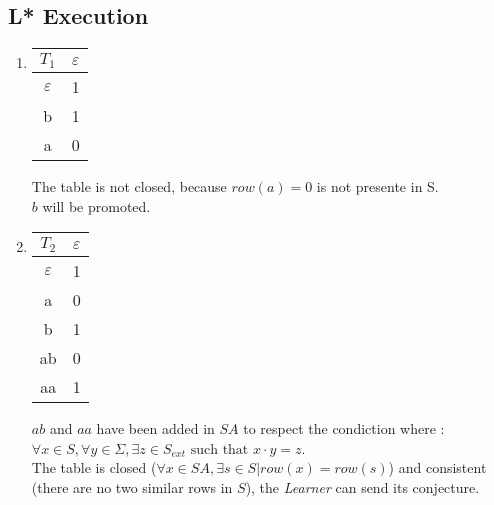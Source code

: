 \subsection{L* Execution}
\begin{enumerate}
  \item \begin{minipage}{0.3\textwidth}
          \begin{tabular}{c||c}
            $T_1$         & $\varepsilon$ \\
            \hline\hline
            $\varepsilon$ & 1             \\
            \hline\hline
            b             & 1             \\
            a             & 0             \\
          \end{tabular}
        \end{minipage} \quad
        \begin{minipage}{0.6\textwidth}
          The table is not closed, because $row(a) = 0$ is not presente in S. \\
          $b$ will be promoted.
        \end{minipage}
  \item \begin{minipage}{0.3\textwidth}
          \begin{tabular}{c||c}
            $T_2$         & $\varepsilon$ \\
            \hline\hline
            $\varepsilon$ & 1             \\
            a             & 0             \\
            \hline\hline
            b             & 1             \\
            ab            & 0             \\
            aa            & 1             \\
          \end{tabular}
        \end{minipage}\quad
        \begin{minipage}{0.6\textwidth}
          $ab$ and $aa$ have been added in $SA$ to respect the condiction where : $\forall x \in S, \forall y \in \Sigma, \exists z \in S_{ext} \text{ such that } x \cdot y = z $.\\
          The table is closed ($\forall x \in SA, \exists s \in S | row(x) = row(s)$) and consistent (there are no two similar rows in $S$), the \textit{Learner} can send its conjecture.
        \end{minipage}


\end{enumerate}
